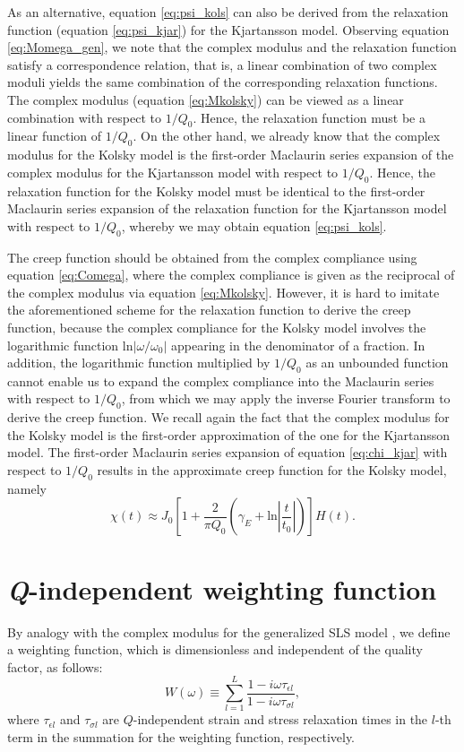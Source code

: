 \documentclass[article]{./macros/elsarticle_qh}
\begin{document}
As an alternative, equation \ref{eq:psi_kols} can also be derived from the relaxation function (equation \ref{eq:psi_kjar}) for the Kjartansson model. Observing equation \ref{eq:Momega_gen}, we note that the complex modulus and the relaxation function satisfy a correspondence relation, that is, a linear combination of two complex moduli yields the same combination of the corresponding relaxation functions. The complex modulus (equation \ref{eq:Mkolsky}) can be viewed as a linear combination with respect to $1/Q_{0}$. Hence, the relaxation function must be a linear function of $1/Q_{0}$. On the other hand, we already know that the complex modulus for the Kolsky model is the first-order Maclaurin series expansion of the complex modulus for the Kjartansson model with respect to $1/Q_{0}$. Hence, the relaxation function for the Kolsky model must be identical to the first-order Maclaurin series expansion of the relaxation function for the Kjartansson model with respect to $1/Q_{0}$, whereby we may obtain equation \ref{eq:psi_kols}.

The creep function should be obtained from the complex compliance using equation \ref{eq:Comega}, where the complex compliance is given as the reciprocal of the complex modulus via equation \ref{eq:Mkolsky}. However, it is hard to imitate the aforementioned scheme for the relaxation function to derive the creep function, because the complex compliance for the Kolsky model involves the logarithmic function $\text{ln}|\omega/\omega_{0}|$ appearing in the denominator of a fraction. In addition, the logarithmic function multiplied by $1/Q_{0}$ as an unbounded function cannot enable us to expand the complex compliance into the Maclaurin series with respect to $1/Q_{0}$, from which we may apply the inverse Fourier transform to derive the creep function. We recall again the fact that the complex modulus for the Kolsky model is the first-order approximation of the one for the Kjartansson model. The first-order Maclaurin series expansion of equation \ref{eq:chi_kjar} with respect to $1/Q_{0}$ results in the approximate creep function for the Kolsky model, namely
\begin{equation} \label{eq:chi_kols}
\chi(t) \approx J_{0} \left[
1 + \frac{2}{\pi Q_{0}}\left(\gamma_{E} + 
\text{ln}\left| \frac{t}{t_{0}} \right| \right)
\right] H(t) .
\end{equation} 

\section{\textit{Q}-independent weighting function}
By analogy with the complex modulus for the generalized SLS model \cite[]{carcione:2014,hao.greenhalgh:2019}, we define a weighting function, which is dimensionless and independent of the quality factor, as follows:
\vspace{-1ex}
\begin{equation} \label{eq:W}
W(\omega)
\equiv \sum_{l=1}^{L} \frac{1-i\omega\tau_{\epsilon l}}{1-i\omega\tau_{\sigma l}} ,
\end{equation}
where $\tau_{\epsilon l}$ and $\tau_{\sigma l}$ are $Q$-independent strain and stress relaxation times in the $l$-th term in the summation for the weighting function, respectively. 
\end{document}
